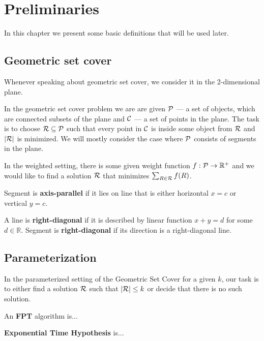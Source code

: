 \chapter{Preliminaries}

In this chapter we present some basic definitions that
will be used later.

\section{Geometric set cover}
\label{section:def:geometric__set_cover}
Whenever speaking about geometric set cover,
we consider it in the 2-dimensional plane.

In the geometric set cover problem we are are given
$\mathcal{P}$ --- a set of objects, which are connected
subsets of the plane and $\mathcal{C}$ --- a set of points in the plane.
The task is to choose $\mathcal{R} \subseteq \mathcal{P}$ such that
every point in $\mathcal{C}$ is inside some object from $\mathcal{R}$
and $|\mathcal{R}|$ is minimized. We will mostly consider the case where
$\mathcal{P}$ consists of segments in the plane.

In the weighted setting, there is some given weight function
$f : \mathcal{P} \rightarrow \mathbb{R^+}$
and we would like to find a solution $\mathcal{R}$
that minimizes $\sum_{R \in \mathcal{R}} f(R)$.

\begin{defi}
Segment is \textbf{axis-parallel} if it lies on line that is
either horizontal $x = c$ or vertical $y = c$.
\end{defi}

\begin{defi}
	A line is \textbf{right-diagonal} if it is
	described by linear function $x + y = d$ for some $d \in \mathbb{R}$.
	Segment is \textbf{right-diagonal} if its
	direction is a right-diagonal line.
\end{defi}

\section{Parameterization}

In the parameterized setting of the Geometric Set Cover
for a given $k$,
our task is to either find a solution $\mathcal{R}$ such that $|\mathcal{R}| \le k$
or decide that there is no such solution.

\begin{defi}
An \textbf{FPT} algorithm is...
\end{defi}

\begin{defi}
\textbf{Exponential Time Hypothesis} is...
\end{defi}


